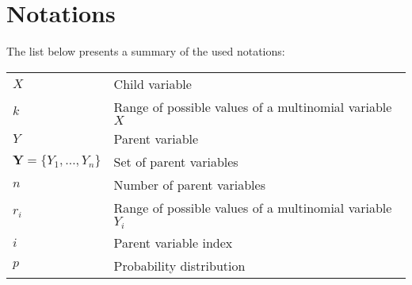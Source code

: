 \documentclass[11pt, oneside]{article}   	%
\numberwithin{figure}{section}
\numberwithin{equation}{section}
\numberwithin{table}{section}
\begin{document}
\newpage
\section*{Notations}

The list below presents a summary of the used notations:
\\

\begin{table}[ht!]
\renewcommand{\arraystretch}{1.1}
{\small
\begin{tabular}{l l}
$X$ & Child variable\\
$k$& Range of possible values of a multinomial variable $X$\\
$Y$ & Parent variable\\
$\mathbf{Y} = \{Y_1,\ldots,Y_n\}$ & Set of parent variables\\
$n$& Number of parent variables \\
$r_i$& Range of possible values of a multinomial variable $Y_i$\\
$i$ & Parent variable index \\
$p$ & Probability distribution\\
\end{tabular}}
\end{table}
\end{document}
